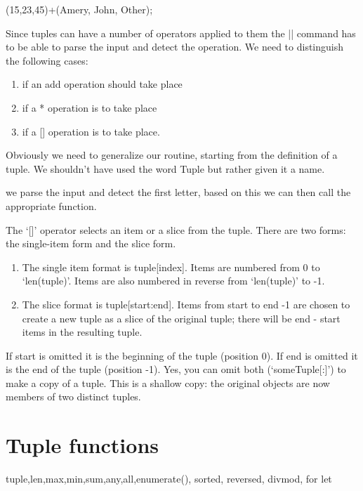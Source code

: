\documentclass{tufte-book}
\begin{document}
\Tuple (15,23,45)+(Amery, John, Other);


\newtuple


Since tuples can have a number of operators applied to them the |\string\Tuple| command has to be able to parse the input and detect the operation. We need to distinguish the following cases:

\begin{enumerate}
\item if an add operation should take place
\item if a * operation is to take place
\item if a [] operation is to take place.
\end{enumerate}


Obviously we need to generalize our routine, starting from the definition of a tuple. We shouldn't have used the word Tuple but rather given it a name.



we parse the input and detect the first letter, based on this we can then call the appropriate function.


The ‘[]’ operator selects an item or a slice from the tuple.
There are two forms: the single-item form and the slice form.

\begin{enumerate}
\item The single item format is tuple[index]. Items are numbered from 0 to `len(tuple)'. Items are also
numbered in reverse from `len(tuple)' to -1.

\item The slice format is tuple[start:end]. Items from start to end -1 are chosen to create a new tuple
as a slice of the original tuple; there will be end - start items in the resulting tuple.
\end{enumerate}


If start is omitted it is the beginning of the tuple (position 0).
If end is omitted it is the end of the tuple (position -1).
Yes, you can omit both (‘someTuple[:]’) to make a copy of a tuple. This is a shallow copy: the
original objects are now members of two distinct tuples.

\section{Tuple functions}

tuple,len,max,min,sum,any,all,enumerate(), sorted, reversed, divmod, for let
\end{document}
